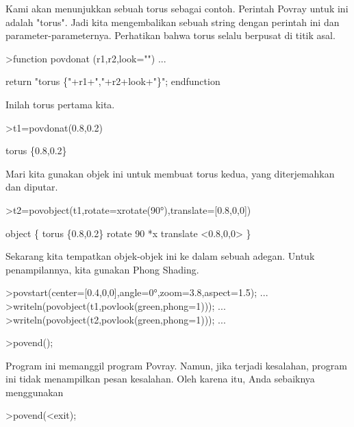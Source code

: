 \documentclass[a4paper,10pt]{article}
\begin{document}
\begin{eulernotebook}
\begin{eulercomment}
\begin{eulercomment}
\begin{eulercomment}
Kami akan menunjukkan sebuah torus sebagai contoh. Perintah Povray
untuk ini adalah "torus". Jadi kita mengembalikan sebuah string dengan
perintah ini dan parameter-parameternya. Perhatikan bahwa torus selalu
berpusat di titik asal.
\end{eulercomment}
\begin{eulerprompt}
>function povdonat (r1,r2,look="") ...
\end{eulerprompt}
\begin{eulerudf}
    return "torus \{"+r1+","+r2+look+"\}";
  endfunction
\end{eulerudf}
\begin{eulercomment}
Inilah torus pertama kita.
\end{eulercomment}
\begin{eulerprompt}
>t1=povdonat(0.8,0.2)
\end{eulerprompt}
\begin{euleroutput}
  torus \{0.8,0.2\}
\end{euleroutput}
\begin{eulercomment}
Mari kita gunakan objek ini untuk membuat torus kedua, yang
diterjemahkan dan diputar.
\end{eulercomment}
\begin{eulerprompt}
>t2=povobject(t1,rotate=xrotate(90°),translate=[0.8,0,0])
\end{eulerprompt}
\begin{euleroutput}
  object \{ torus \{0.8,0.2\}
   rotate 90 *x 
   translate <0.8,0,0>
   \}
\end{euleroutput}
\begin{eulercomment}
Sekarang kita tempatkan objek-objek ini ke dalam sebuah adegan. Untuk
penampilannya, kita gunakan Phong Shading.
\end{eulercomment}
\begin{eulerprompt}
>povstart(center=[0.4,0,0],angle=0°,zoom=3.8,aspect=1.5); ...
>writeln(povobject(t1,povlook(green,phong=1))); ...
>writeln(povobject(t2,povlook(green,phong=1))); ...
\end{eulerprompt}
\begin{eulerttcomment}
 >povend();
\end{eulerttcomment}
\begin{eulercomment}
Program ini memanggil program Povray. Namun, jika terjadi kesalahan,
program ini tidak menampilkan pesan kesalahan. Oleh karena itu, Anda
sebaiknya menggunakan

\end{eulercomment}
\begin{eulerttcomment}
 >povend(<exit);
\end{eulerttcomment}
\begin{eulercomment}


\end{eulercomment}
\end{eulercomment}
\end{eulercomment}
\end{eulernotebook}
\end{document}
